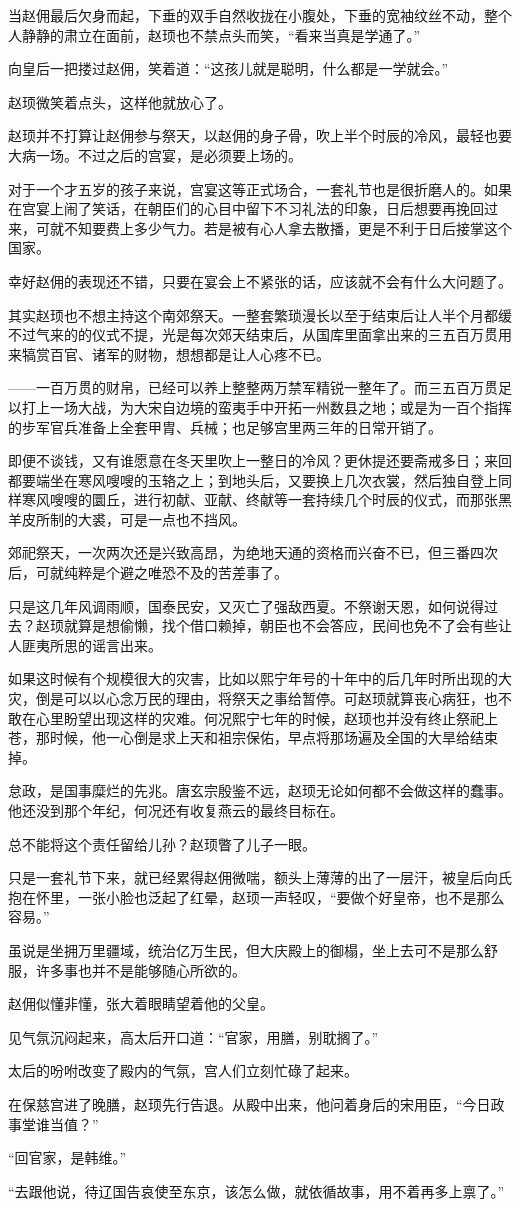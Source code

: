 当赵佣最后欠身而起，下垂的双手自然收拢在小腹处，下垂的宽袖纹丝不动，整个人静静的肃立在面前，赵顼也不禁点头而笑，“看来当真是学通了。”

向皇后一把搂过赵佣，笑着道：“这孩儿就是聪明，什么都是一学就会。”

赵顼微笑着点头，这样他就放心了。

赵顼并不打算让赵佣参与祭天，以赵佣的身子骨，吹上半个时辰的冷风，最轻也要大病一场。不过之后的宫宴，是必须要上场的。

对于一个才五岁的孩子来说，宫宴这等正式场合，一套礼节也是很折磨人的。如果在宫宴上闹了笑话，在朝臣们的心目中留下不习礼法的印象，日后想要再挽回过来，可就不知要费上多少气力。若是被有心人拿去散播，更是不利于日后接掌这个国家。

幸好赵佣的表现还不错，只要在宴会上不紧张的话，应该就不会有什么大问题了。

其实赵顼也不想主持这个南郊祭天。一整套繁琐漫长以至于结束后让人半个月都缓不过气来的的仪式不提，光是每次郊天结束后，从国库里面拿出来的三五百万贯用来犒赏百官、诸军的财物，想想都是让人心疼不已。

——一百万贯的财帛，已经可以养上整整两万禁军精锐一整年了。而三五百万贯足以打上一场大战，为大宋自边境的蛮夷手中开拓一州数县之地；或是为一百个指挥的步军官兵准备上全套甲胄、兵械；也足够宫里两三年的日常开销了。

即便不谈钱，又有谁愿意在冬天里吹上一整日的冷风？更休提还要斋戒多日；来回都要端坐在寒风嗖嗖的玉辂之上；到地头后，又要换上几次衣裳，然后独自登上同样寒风嗖嗖的圜丘，进行初献、亚献、终献等一套持续几个时辰的仪式，而那张黑羊皮所制的大裘，可是一点也不挡风。

郊祀祭天，一次两次还是兴致高昂，为绝地天通的资格而兴奋不已，但三番四次后，可就纯粹是个避之唯恐不及的苦差事了。

只是这几年风调雨顺，国泰民安，又灭亡了强敌西夏。不祭谢天恩，如何说得过去？赵顼就算是想偷懒，找个借口赖掉，朝臣也不会答应，民间也免不了会有些让人匪夷所思的谣言出来。

如果这时候有个规模很大的灾害，比如以熙宁年号的十年中的后几年时所出现的大灾，倒是可以以心念万民的理由，将祭天之事给暂停。可赵顼就算丧心病狂，也不敢在心里盼望出现这样的灾难。何况熙宁七年的时候，赵顼也并没有终止祭祀上苍，那时候，他一心倒是求上天和祖宗保佑，早点将那场遍及全国的大旱给结束掉。

怠政，是国事糜烂的先兆。唐玄宗殷鉴不远，赵顼无论如何都不会做这样的蠢事。他还没到那个年纪，何况还有收复燕云的最终目标在。

总不能将这个责任留给儿孙？赵顼瞥了儿子一眼。

只是一套礼节下来，就已经累得赵佣微喘，额头上薄薄的出了一层汗，被皇后向氏抱在怀里，一张小脸也泛起了红晕，赵顼一声轻叹，“要做个好皇帝，也不是那么容易。”

虽说是坐拥万里疆域，统治亿万生民，但大庆殿上的御榻，坐上去可不是那么舒服，许多事也并不是能够随心所欲的。

赵佣似懂非懂，张大着眼睛望着他的父皇。

见气氛沉闷起来，高太后开口道：“官家，用膳，别耽搁了。”

太后的吩咐改变了殿内的气氛，宫人们立刻忙碌了起来。

在保慈宫进了晚膳，赵顼先行告退。从殿中出来，他问着身后的宋用臣，“今日政事堂谁当值？”

“回官家，是韩维。”

“去跟他说，待辽国告哀使至东京，该怎么做，就依循故事，用不着再多上禀了。”
